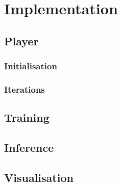 \appendix

\section{Implementation}

\subsection{Player}

\subsubsection{Initialisation}

\subsubsection{Iterations}

\subsection{Training}

\subsection{Inference}


\subsection{Visualisation}
